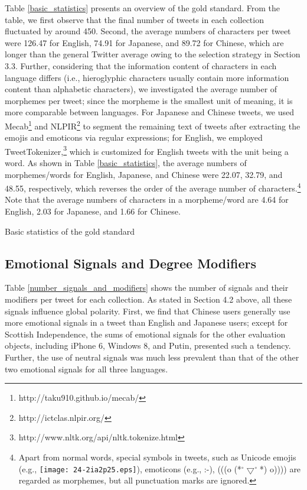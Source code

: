 \documentclass[english]{jnlp_1.4}
\begin{document}
Table \ref{basic_statistics} presents an overview of the gold standard. From the table, we first observe that the final number of tweets in each collection fluctuated by around 450. Second, the average numbers of characters per tweet were 126.47 for English, 74.91 for Japanese, and 89.72 for Chinese, which are longer than the general Twitter average \cite{Neubig13} owing to the selection strategy in Section 3.3. Further, considering that the information content of characters in each language differs (i.e., hieroglyphic characters usually contain more information content than alphabetic characters), we investigated the average number of morphemes per tweet; since the morpheme is the smallest unit of meaning, it is more comparable between languages. For Japanese and Chinese tweets, we used Mecab\footnote{http://taku910.github.io/mecab/} and NLPIR\footnote{http://ictclas.nlpir.org/} to segment the remaining text of tweets after extracting the emojis and emoticons via regular expressions; for English, we employed TweetTokenizer,\footnote{http://www.nltk.org/api/nltk.tokenize.html} which is customized for English tweets with the unit being a word. As shown in Table \ref{basic_statistics}, the average numbers of morphemes/words for English, Japanese, and Chinese were 22.07, 32.79, and 48.55, respectively, which reverses the order of the average number of characters.\footnote{Apart from normal words, special symbols in tweets, such as Unicode emojis (e.g., \texttt{[image: 24-2ia2p25.eps]}), emoticons (e.g., :-), (((o (*$^{\circ}▽^{\circ}$*) o)))) are regarded as morphemes, but all punctuation marks are ignored.} Note that the average numbers of characters in a morpheme/word are 4.64 for English, 2.03 for Japanese, and 1.66 for Chinese. 

\begin{table}[t]
\caption{Basic statistics of the gold standard}
\label{basic_statistics}

\end{table}


\subsection{Emotional Signals and Degree Modifiers}

Table \ref{number_signals_and_modifiers} shows the number of signals and their modifiers per tweet for each collection. As stated in Section 4.2 above, all these signals influence global polarity. First, we find that Chinese users generally use more emotional signals in a tweet than English and Japanese users; except for Scottish Independence, the sums of emotional signals for the other evaluation objects, including iPhone 6, Windows 8, and Putin, presented such a tendency. Further, the use of neutral signals was much less prevalent than that of the other two emotional signals for all three languages.
\end{document}

